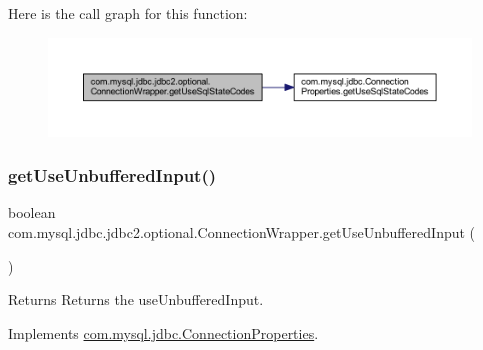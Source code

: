 Here is the call graph for this function\+:
\nopagebreak
\begin{figure}[H]
\begin{center}
\leavevmode
\includegraphics[width=350pt]{classcom_1_1mysql_1_1jdbc_1_1jdbc2_1_1optional_1_1_connection_wrapper_a2edc5b51339d1e377af614a97cc844ad_cgraph}
\end{center}
\end{figure}
\mbox{\label{classcom_1_1mysql_1_1jdbc_1_1jdbc2_1_1optional_1_1_connection_wrapper_a3c1db049eb316025a36115fbc35b225f}} 
\subsubsection{\texorpdfstring{get\+Use\+Unbuffered\+Input()}{getUseUnbufferedInput()}}
{\footnotesize\ttfamily boolean com.\+mysql.\+jdbc.\+jdbc2.\+optional.\+Connection\+Wrapper.\+get\+Use\+Unbuffered\+Input (\begin{DoxyParamCaption}{ }\end{DoxyParamCaption})}

\begin{DoxyReturn}{Returns}
Returns the use\+Unbuffered\+Input. 
\end{DoxyReturn}


Implements \mbox{\hyperlink{interfacecom_1_1mysql_1_1jdbc_1_1_connection_properties_a7776bd98c8537739178d1c9a42bd9e8c}{com.\+mysql.\+jdbc.\+Connection\+Properties}}.

